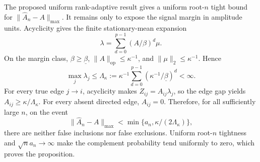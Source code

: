 The proposed uniform rank-adaptive result gives a uniform root-\(n\) tight bound for \(\|\widehat A_n-A\|_{\max}\).  It remains only to expose the signal margin in amplitude units.  Acyclicity gives the finite stationary-mean expansion
\[
 \lambda=\sum_{d=0}^{p-1}(A/\beta)^d\mu.
\]
On the margin class, \(\beta\geq\underline\beta\), \(\|A\|_{\mathrm{op}}\leq\kappa^{-1}\), and \(\|\mu\|_2\leq\kappa^{-1}\).  Hence
\[
 \max_j\lambda_j\leq\Lambda_\kappa:=\kappa^{-1}\sum_{d=0}^{p-1}(\kappa^{-1}/\underline\beta)^d<\infty.
\]
For every true edge \(j\to i\), acyclicity makes \(Z_{ij}=A_{ij}\lambda_j\), so the edge gap yields \(A_{ij}\geq\kappa/\Lambda_\kappa\).  For every absent directed edge, \(A_{ij}=0\).  Therefore, for all sufficiently large \(n\), on the event
\[
 \|\widehat A_n-A\|_{\max}<\min\{a_n,\kappa/(2\Lambda_\kappa)\},
\]
there are neither false inclusions nor false exclusions.  Uniform root-\(n\) tightness and \(\sqrt n a_n\to\infty\) make the complement probability tend uniformly to zero, which proves the proposition.